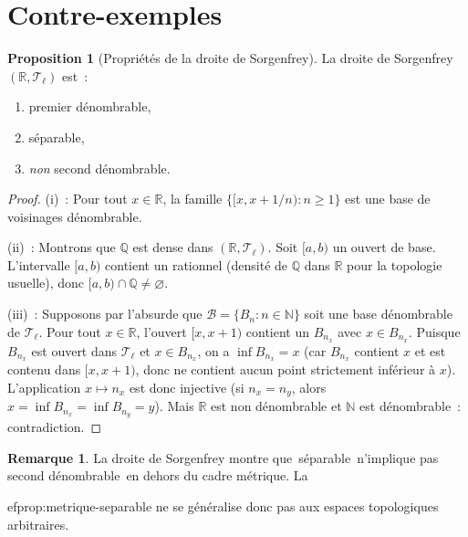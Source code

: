 \documentclass[12pt,a4paper,openany]{book}
\theoremstyle{definition}
\theoremstyle{cours}
\newtheorem{proposition}[theoreme]{Proposition}
\theoremstyle{coursnormal}
\newtheorem{remarque}[theoreme]{Remarque}
\newcommand{\N}{\mathbb{N}}
\newcommand{\Q}{\mathbb{Q}}
\newcommand{\R}{\mathbb{R}}
\newcommand{\T}{\mathcal{T}}
\newcommand{\B}{\mathcal{B}}
\providecommand{\og}{\guillemotleft\,}
\providecommand{\fg}{\,\guillemotright}
\begin{document}
\section{Contre-exemples}\label{sec:contre-exemples-ch3}

\begin{proposition}[Propriétés de la droite de Sorgenfrey]\label{prop:sorgenfrey-proprietes}
  La droite de Sorgenfrey $(\R,\T_\ell)$ est~:
  \begin{enumerate}[label=\textup{(\roman*)}]
    \item premier dénombrable,
    \item séparable,
    \item \emph{non} second dénombrable.
  \end{enumerate}
\end{proposition}

\begin{proof}
  \textup{(i)}~: Pour tout $x\in\R$, la famille
  $\{[x,x+1/n) : n\geq 1\}$ est une base de voisinages dénombrable.

  \textup{(ii)}~: Montrons que $\Q$ est dense dans $(\R,\T_\ell)$. Soit
  $[a,b)$ un ouvert de base. L'intervalle $[a,b)$ contient un rationnel
  (densité de $\Q$ dans $\R$ pour la topologie usuelle), donc
  $[a,b)\cap\Q\neq\varnothing$.

  \textup{(iii)}~: Supposons par l'absurde que $\B=\{B_n : n\in\N\}$ soit une
  base dénombrable de $\T_\ell$. Pour tout $x\in\R$, l'ouvert $[x,x+1)$
  contient un $B_{n_x}$ avec $x\in B_{n_x}$. Puisque $B_{n_x}$ est ouvert
  dans $\T_\ell$ et $x\in B_{n_x}$, on a $\inf B_{n_x}=x$ (car $B_{n_x}$
  contient $x$ et est contenu dans $[x,x+1)$, donc ne contient aucun point
  strictement inférieur à $x$). L'application $x\mapsto n_x$ est donc
  injective (si $n_x=n_y$, alors $x=\inf B_{n_x}=\inf B_{n_y}=y$). Mais
  $\R$ est non dénombrable et $\N$ est dénombrable~: contradiction.
\end{proof}

\begin{remarque}
  La droite de Sorgenfrey montre que \og{}séparable\fg{} n'implique pas
  \og{}second dénombrable\fg{} en dehors du cadre métrique. La
  
ef{prop:metrique-separable} ne se généralise donc pas aux espaces
  topologiques arbitraires.
\end{remarque}
\end{document}
